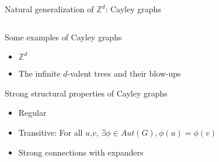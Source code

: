 \documentclass[11pt,dvipsnames,presentation,aspectratio=169]{beamer}
\newcommand{\myorange}{Orange}
\begin{document}
\begin{frame}{Natural generalization of $\mathbb{Z}^d$: Cayley graphs}

  \begin{columns}
    \hfill
    \begin{column}{.65\textwidth}
      \begin{exampleblock}{Some examples of Cayley graphs}
        \begin{itemize}
        \item $\mathbb{Z}^d$
        \item The infinite $d$-valent trees and their blow-ups
        \end{itemize}
      \end{exampleblock}

      \begin{block}{Strong structural properties of Cayley graphs}
        \begin{itemize}
        \item Regular
        \item Transitive: For all $u$,$v$, $\exists \phi \in Aut(G), \phi(u) = \phi(v)$
        \item Strong connections with expanders
        \end{itemize}
      \end{block}
    \end{column}
    \begin{column}{.35\textwidth}
      \begin{center}
        
        
        \vspace{.2cm}
\end{center}
\end{column}
\end{columns}
\end{frame}
\end{document}
